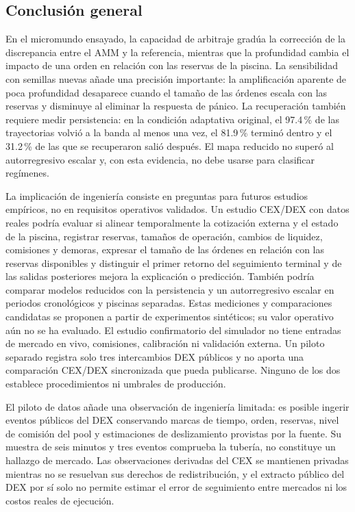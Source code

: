 \begin{samepage}
\section{Conclusión general}

En el micromundo ensayado, la capacidad de arbitraje gradúa la corrección de la discrepancia entre el AMM y la referencia, mientras que la profundidad cambia el impacto de una orden en relación con las reservas de la piscina. La sensibilidad con semillas nuevas añade una precisión importante: la amplificación aparente de poca profundidad desaparece cuando el tamaño de las órdenes escala con las reservas y disminuye al eliminar la respuesta de pánico. La recuperación también requiere medir persistencia: en la condición adaptativa original, el 97.4\,\% de las trayectorias volvió a la banda al menos una vez, el 81.9\,\% terminó dentro y el 31.2\,\% de las que se recuperaron salió después. El mapa reducido no superó al autorregresivo escalar y, con esta evidencia, no debe usarse para clasificar regímenes.

La implicación de ingeniería consiste en preguntas para futuros estudios empíricos, no en requisitos operativos validados. Un estudio CEX/DEX con datos reales podría evaluar si alinear temporalmente la cotización externa y el estado de la piscina, registrar reservas, tamaños de operación, cambios de liquidez, comisiones y demoras, expresar el tamaño de las órdenes en relación con las reservas disponibles y distinguir el primer retorno del seguimiento terminal y de las salidas posteriores mejora la explicación o predicción. También podría comparar modelos reducidos con la persistencia y un autorregresivo escalar en periodos cronológicos y piscinas separadas. Estas mediciones y comparaciones candidatas se proponen a partir de experimentos sintéticos; su valor operativo aún no se ha evaluado. El estudio confirmatorio del simulador no tiene entradas de mercado en vivo, comisiones, calibración ni validación externa. Un piloto separado registra solo tres intercambios DEX públicos y no aporta una comparación CEX/DEX sincronizada que pueda publicarse. Ninguno de los dos establece procedimientos ni umbrales de producción.

El piloto de datos añade una observación de ingeniería limitada: es posible ingerir eventos públicos del DEX conservando marcas de tiempo, orden, reservas, nivel de comisión del pool y estimaciones de deslizamiento provistas por la fuente. Su muestra de seis minutos y tres eventos comprueba la tubería, no constituye un hallazgo de mercado. Las observaciones derivadas del CEX se mantienen privadas mientras no se resuelvan sus derechos de redistribución, y el extracto público del DEX por sí solo no permite estimar el error de seguimiento entre mercados ni los costos reales de ejecución.


\end{samepage}
